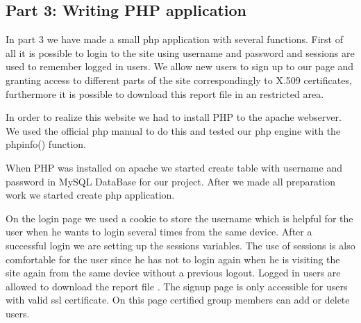 \subsection {Part 3: Writing PHP application}


\noindent
In part 3 we have made a small php application with several functions. First of all it is possible to login to the site using username and password and sessions are used to remember logged in users. We allow new users to sign up to our page and granting access to different parts of the site correspondingly to X.509 certificates, furthermore it is possible to download this report file in an restricted area. \newline

\noindent
In order to realize this website we had to install PHP to the apache webserver. We used the official php manual to do this \cite{phpinstall}  and tested our php engine with the phpinfo() function.\newline

\noindent
When PHP was installed on apache we started  create table  with username and password  in MySQL DataBase for our project. After we made all preparation work we started create php application. 
\newline

\noindent
On the login page we used a cookie to store the username which is helpful for the user when he wants to login several times from the same device. After a successful login we are setting up the sessions variables. The use of sessions is also comfortable for the user since he has not to login again when he is visiting the site again from the same device without a previous logout. Logged in users  are allowed to download the report file . The signup page is only accessible for users with valid ssl certificate. On this page certified group members can add or delete users.
\newline


